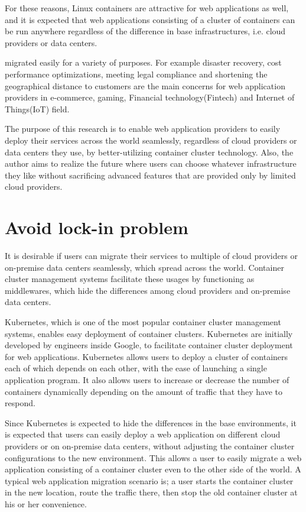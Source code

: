 For these reasons, Linux containers are attractive for web applications as well, and it is expected that web applications consisting of a cluster of containers can be run anywhere regardless of the difference in base infrastructures, i.e. cloud providers or data centers.

migrated easily for a variety of purposes.
For example disaster recovery, cost performance optimizations, meeting legal compliance and shortening the geographical distance to customers are the main concerns for web application providers in e-commerce, gaming, Financial technology(Fintech) and Internet of Things(IoT) field.

The purpose of this research is to enable web application providers to easily deploy their services across the world seamlessly, regardless of cloud providers or data centers they use, by better-utilizing container cluster technology. 
Also, the author aims to realize the future where users can choose whatever infrastructure they like without sacrificing advanced features that are provided only by limited cloud providers.

\section{Avoid lock-in problem}

It is desirable if users can migrate their services to multiple of cloud providers or on-premise data centers seamlessly, which spread across the world.
Container cluster management systems facilitate these usages by functioning as middlewares, which hide the differences among cloud providers and on-premise data centers.

Kubernetes\cite{K8s2017}, which is one of the most popular container cluster management systems, enables easy deployment of container clusters.
Kubernetes are initially developed by engineers inside Google, to facilitate container cluster deployment for web applications.
Kubernetes allows users to deploy a cluster of containers each of which depends on each other, with the ease of launching a single application program.
It also allows users to increase or decrease the number of containers dynamically depending on the amount of traffic that they have to respond.

Since Kubernetes is expected to hide the differences in the base environments, it is expected that users can easily deploy a web application on different cloud providers or on on-premise data centers, without adjusting the container cluster configurations to the new environment. 
This allows a user to easily migrate a web application consisting of a container cluster even to the other side of the world.
A typical web application migration scenario is; 
a user starts the container cluster in the new location, route the traffic there, then stop the old container cluster at his or her convenience.

